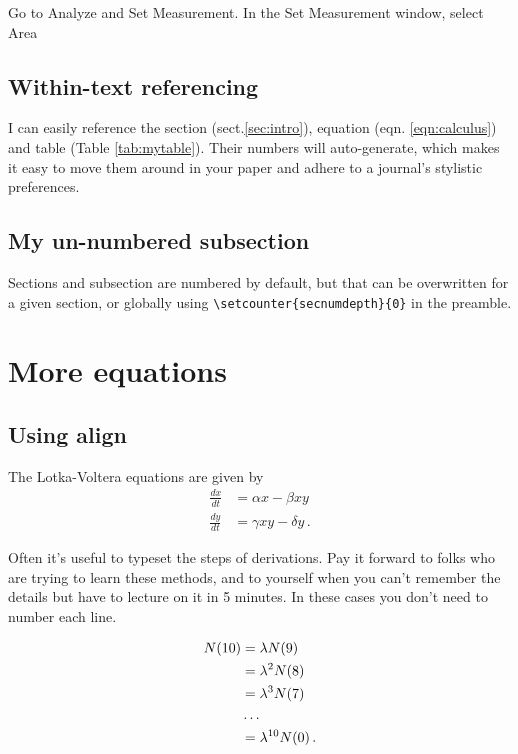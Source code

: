 \documentclass[12pt,letterpaper]{article}
\begin{document}
Go to Analyze and Set Measurement. In the Set Measurement window, select Area


\subsection{Within-text referencing}

I can easily reference the section (sect.\ref{sec:intro}), equation (eqn. \ref{eqn:calculus}) and table (Table \ref{tab:mytable}).
Their numbers will auto-generate, which makes it easy to move them around in your paper and adhere to
a journal's stylistic preferences.



\subsection*{My un-numbered subsection}

Sections and subsection are numbered by default, but that can be overwritten for a given section, or globally using \verb+\setcounter{secnumdepth}{0}+ in the preamble.




\section{More equations}

\subsection*{Using align}

The Lotka-Voltera equations are given by
\begin{align}
\frac{dx}{dt} 	&=	\alpha x - \beta xy \\
\frac{dy}{dt}	&=	\gamma xy - \delta y \,.
\end{align}

\noindent
Often it's useful to typeset the steps of derivations.
Pay it forward to folks who are trying to learn these methods, and to yourself when you can't remember the details but have to lecture on it in 5 minutes.
In these cases you don't need to number each line.

\begin{align}
N(10) 	&= 	\lambda N(9) 		\\ 		\notag
		&= 	\lambda^2 N(8) 	\\		\notag
		&=	\lambda^3 N(7) 	\\		\notag
		& \dots				\\		\notag
		&=	\lambda^{10} N(0) \,.	\\		\notag
\end{align}
\end{document}
